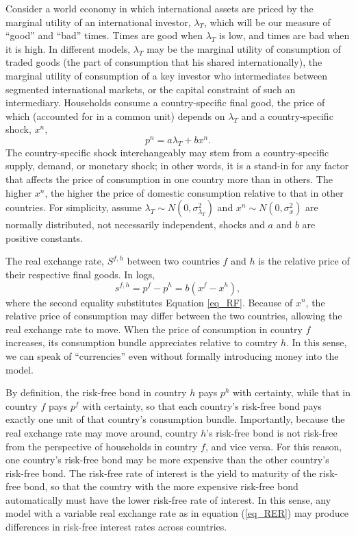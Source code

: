 \documentclass{ar-1col}
\begin{document}
Consider a world economy in which international assets are priced by the marginal utility of an international investor, $\lambda_T$, which will be our measure of ``good'' and ``bad'' times. Times are good when $\lambda_T$ is low, and times are bad when it is high. In different models, $\lambda_T$ may be the marginal utility of consumption of traded goods (the part of consumption that his shared internationally), the marginal utility of consumption of a key investor who intermediates between segmented international markets, or the capital constraint of such an intermediary. Households consume a country-specific final good, the price of which (accounted for in a common unit) depends on $\lambda_T$ and a country-specific shock, $x^n$,
\begin{equation}
  p^{n} = a\lambda_{T} + b x^{n}.  
  \label{eq_RF}
\end{equation}%
The country-specific shock interchangeably may stem from a country-specific supply, demand, or monetary shock; in other words, it is a stand-in for any factor that affects the price of consumption in one country more than in others. The higher $x^{n}$, the higher the price of domestic consumption relative to that in other countries. For simplicity, assume $\lambda _{T}\sim N(0,\sigma^2_{\lambda_{T}})$ and $x^{n} \sim N(0,\sigma^2_x) $ are normally distributed, not necessarily independent, shocks and $a$ and $b$ are positive constants.

The real exchange rate, $S^{f, h}$ between two countries $f$ and $h$ is the relative price of their respective final goods. In logs,
\begin{equation}
  s^{f,h} 
  = p^f - p^h 
  = b(x^f - x^h),
\label{eq_RER}
\end{equation}
where the second equality substitutes Equation \eqref{eq_RF}. Because of $x^{n}$, the relative price of consumption may differ between the two countries, allowing the real exchange rate to move. When the price of consumption in country $f$ increases, its consumption bundle appreciates relative to country $h$. In this sense, we can speak of ``currencies'' even without formally introducing money into the model.

By definition, the risk-free bond in country $h$ pays $p^h$ with certainty, while that in country $f$ pays $p^f$ with certainty, so that each country's risk-free bond pays exactly one unit of that country's consumption bundle. Importantly, because the real exchange rate may move around, country $h$'s risk-free bond is not risk-free from the perspective of households in country $f$, and vice versa. For this reason, one country's risk-free bond may be more expensive than the other country's risk-free bond. The risk-free rate of interest is the yield to maturity of the risk-free bond, so that the country with the more expensive risk-free bond automatically must have the lower risk-free rate of interest. In this sense, any model with a variable real exchange rate as in equation (\ref{eq_RER}) may produce differences in risk-free interest rates across countries.
\end{document}
